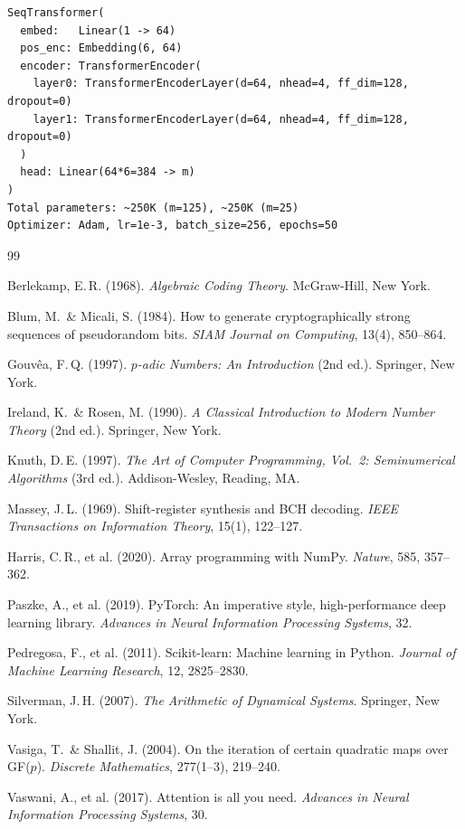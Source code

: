 \documentclass[11pt]{article}
\theoremstyle{plain}
\theoremstyle{definition}
\begin{document}
\begin{verbatim}
SeqTransformer(
  embed:   Linear(1 -> 64)
  pos_enc: Embedding(6, 64)
  encoder: TransformerEncoder(
    layer0: TransformerEncoderLayer(d=64, nhead=4, ff_dim=128, dropout=0)
    layer1: TransformerEncoderLayer(d=64, nhead=4, ff_dim=128, dropout=0)
  )
  head: Linear(64*6=384 -> m)
)
Total parameters: ~250K (m=125), ~250K (m=25)
Optimizer: Adam, lr=1e-3, batch_size=256, epochs=50
\end{verbatim}


\begin{thebibliography}{99}

Berlekamp, E.\,R. (1968).
\textit{Algebraic Coding Theory}.
McGraw-Hill, New York.

Blum, M.\ \& Micali, S. (1984).
How to generate cryptographically strong sequences of pseudorandom bits.
\textit{SIAM Journal on Computing}, 13(4), 850--864.

Gouvêa, F.\,Q. (1997).
\textit{$p$-adic Numbers: An Introduction} (2nd ed.).
Springer, New York.

Ireland, K.\ \& Rosen, M. (1990).
\textit{A Classical Introduction to Modern Number Theory} (2nd ed.).
Springer, New York.

Knuth, D.\,E. (1997).
\textit{The Art of Computer Programming, Vol.\ 2: Seminumerical Algorithms} (3rd ed.).
Addison-Wesley, Reading, MA.

Massey, J.\,L. (1969).
Shift-register synthesis and BCH decoding.
\textit{IEEE Transactions on Information Theory}, 15(1), 122--127.

Harris, C.\,R., et al. (2020).
Array programming with NumPy.
\textit{Nature}, 585, 357--362.

Paszke, A., et al. (2019).
PyTorch: An imperative style, high-performance deep learning library.
\textit{Advances in Neural Information Processing Systems}, 32.

Pedregosa, F., et al. (2011).
Scikit-learn: Machine learning in Python.
\textit{Journal of Machine Learning Research}, 12, 2825--2830.

Silverman, J.\,H. (2007).
\textit{The Arithmetic of Dynamical Systems}.
Springer, New York.

Vasiga, T.\ \& Shallit, J. (2004).
On the iteration of certain quadratic maps over GF($p$).
\textit{Discrete Mathematics}, 277(1--3), 219--240.

Vaswani, A., et al. (2017).
Attention is all you need.
\textit{Advances in Neural Information Processing Systems}, 30.

\end{thebibliography}
\end{document}
